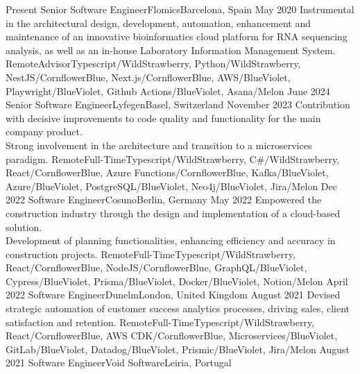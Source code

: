 %
%
%
\begin{experiences}
  \experience
  {Present} {Senior Software Engineer}{Flomics}{Barcelona, Spain}
  {May 2020}    {Instrumental in the architectural design, development, automation, enhancement and maintenance of an 
  innovative bioinformatics cloud platform for RNA sequencing analysis, as well as an in-house Laboratory Information Management System.}
  {Remote}{Advisor}{Typescript/WildStrawberry, Python/WildStrawberry, NestJS/CornflowerBlue, Next.js/CornflowerBlue, AWS/BlueViolet, Playwright/BlueViolet, Github Actions/BlueViolet, Asana/Melon}
  \emptySeparator
  \experience
  {June 2024} {Senior Software Engineer}{Lyfegen}{Basel, Switzerland}
  {November 2023}    {Contribution with decisive improvements to code quality and functionality for the main company product.\\
  Strong involvement in the architecture and transition to a microservices paradigm.}
  {Remote}{Full-Time}{Typescript/WildStrawberry, C\#/WildStrawberry, React/CornflowerBlue, Azure Functions/CornflowerBlue, Kafka/BlueViolet, Azure/BlueViolet, PostgreSQL/BlueViolet, Neo4j/BlueViolet, Jira/Melon} 
  \emptySeparator
  \experience
  {Dec 2022} {Software Engineer}{Cosuno}{Berlin, Germany}
  {May 2022} {Empowered the construction industry through the design and implementation of a cloud-based 
  solution.\\
  Development of planning functionalities, enhancing efficiency and accuracy in construction projects.}
  {Remote}{Full-Time}{Typescript/WildStrawberry, React/CornflowerBlue, NodeJS/CornflowerBlue, GraphQL/BlueViolet, Cypress/BlueViolet, Prisma/BlueViolet, Docker/BlueViolet, Notion/Melon}
  \emptySeparator
  \experience
  {April 2022}   {Software Engineer}{Dunelm}{London, United Kingdom}
  {August 2021} {Devised strategic automation of customer success analytics processes, driving sales,
  client satisfaction and retention.}
  {Remote}{Full-Time}{Typescript/WildStrawberry, React/CornflowerBlue,  AWS CDK/CornflowerBlue, Microservices/BlueViolet, GitLab/BlueViolet, Datadog/BlueViolet, Prismic/BlueViolet, Jira/Melon}
  \emptySeparator
  \experience
  {August 2021}     {Software Engineer}{Void Software}{Leiria, Portugal}

\end{experiences}
